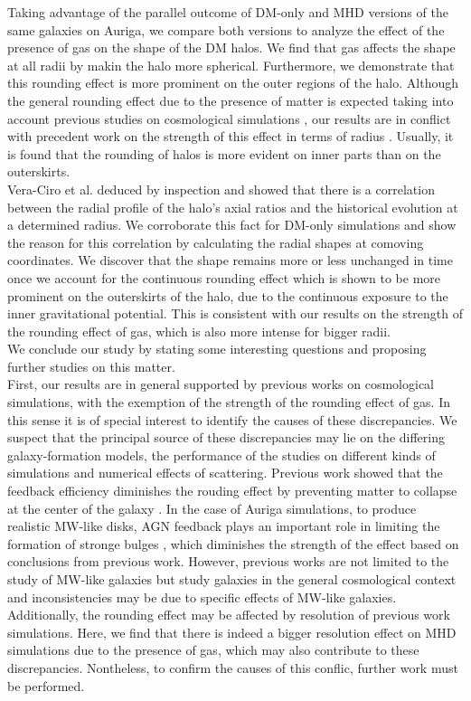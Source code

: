 Taking advantage of the parallel outcome of DM-only and MHD versions of the same galaxies on Auriga, we compare both versions to analyze the effect of the presence of gas on the shape of the DM halos. We find that gas affects the shape at all radii by makin the halo more spherical. Furthermore, we demonstrate that this rounding effect is more prominent on the outer regions of the halo. Although the general rounding effect due to the presence of matter is expected taking into account previous studies on cosmological simulations \cite{Barnes_and_Hernquist_1996,Springel_et_al._2004,Bryan_et_al._2013}, our results are in conflict with precedent work on the strength of this effect in terms of radius \cite{Bryan_et_al._2013}. Usually, it is found that the rounding of halos is more evident on inner parts than on the outerskirts.\\

Vera-Ciro et al. deduced by inspection and showed that there is a correlation between the radial profile of the halo's axial ratios and the historical evolution at a determined radius. We corroborate this fact for DM-only simulations and show the reason for this correlation by calculating the radial shapes at comoving coordinates. We discover that the shape remains more or less unchanged in time once we account for the continuous rounding effect which is shown to be more prominent on the outerskirts of the halo, due to the continuous exposure to the inner gravitational potential. This is consistent with our results on the strength of the rounding effect of gas, which is also more intense for bigger radii.\\

We conclude our study by stating some interesting questions and proposing further studies on this matter.\\

First, our results are in general supported by previous works on cosmological simulations, with the exemption of the strength of the rounding effect of gas. In this sense it is of special interest to identify the causes of these discrepancies. We suspect that the principal source of these discrepancies may lie on the differing galaxy-formation models, the performance of the studies on different kinds of simulations and numerical effects of scattering. Previous work showed that the feedback efficiency diminishes the rouding effect by preventing matter to collapse at the center of the galaxy \cite{Bryan_et_al._2013}. In the case of Auriga simulations, to produce realistic MW-like disks, AGN feedback plays an important role in limiting the formation of stronge bulges \cite{auriga}, which diminishes the strength of the effect based on conclusions from previous work. However, previous works are not limited to the study of MW-like galaxies but study galaxies in the general cosmological context and inconsistencies may be due to specific effects of MW-like galaxies. Additionally, the rounding effect may be affected by resolution of previous work simulations. Here, we find that there is indeed a bigger resolution effect on MHD simulations due to the presence of gas, which may also contribute to these discrepancies. Nontheless, to confirm the causes of this conflic, further work must be performed.\\

